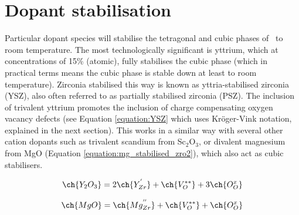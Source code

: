 



\section{Dopant stabilisation}

Particular dopant species will stabilise the tetragonal and cubic phases of \zirconia\ to room temperature. The most technologically significant is yttrium, which at concentrations of 15\% (atomic), fully stabilises the cubic phase (which in practical terms means the cubic phase is stable down at least to room temperature). Zirconia stabilised this way is known as yttria-stabilised zirconia (YSZ), also often referred to as partially stabilised zirconia (PSZ). The inclusion of trivalent yttrium promotes the inclusion of charge compensating oxygen vacancy defects (see Equation \ref{equation:YSZ} which uses Kr\"{o}ger-Vink notation, explained in the next section). This works in a similar way with several other cation dopants such as trivalent scandium from Sc$_{2}$O$_{3}$, or divalent magnesium from MgO (Equation \ref{equation:mg_stabilised_zro2}), which also act as cubic stabilisers.

{
\begin{equation}
\ch{Y_{2}O_{3}} = 2\ch{Y_{Zr}^{'}} + \ch{V_{O}^{**}} + 3\ch{O_{O}^{x}} 
\label{equation:YSZ}
\end{equation}

\begin{equation}
\ch{MgO} = \ch{Mg_{Zr}^{''}} + \ch{V_{O}^{**}} + \ch{O_{O}^{x}} 
\label{equation:mg_stabilised_zro2}
\end{equation}
}

